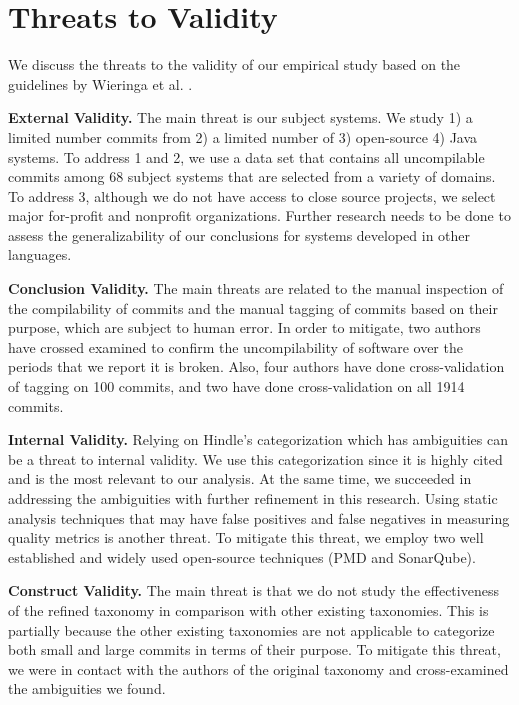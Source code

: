 \section{Threats to Validity}
\label{sec:threats}

We discuss the threats to the validity of our empirical study based on the guidelines by Wieringa et al.
 \cite{38631e0608b54d4299d5707f3a78debf}.


\textbf{External Validity.}
The main threat is our subject systems.
We study 1) a limited number commits from 2) a limited number of 3) open-source 4) Java systems.
To address 1 and 2, we use a data set that contains all uncompilable commits among 68 subject systems that are selected from a variety of domains.
To address 3, although we do not have access to close source projects, we select major for-profit and nonprofit organizations.
Further research needs to be done to assess the generalizability of our conclusions for systems developed in other languages. 

\textbf{Conclusion Validity.}
The main threats are related to the manual inspection of the compilability of commits and the manual tagging of commits based on their purpose, which are subject to human error.
In order to mitigate, two authors have crossed examined to confirm the uncompilability of software over the periods that we report it is broken.
Also, four authors have done cross-validation of tagging on 100 commits, and two have done cross-validation on all 1914 commits.

\textbf{Internal Validity.}
Relying on Hindle's categorization which has ambiguities can be a threat to internal validity.
We use this categorization since it is highly cited and is the most relevant to our analysis. At the same time, we succeeded in addressing the ambiguities with further refinement in this research. 
Using static analysis techniques that may have false positives and false negatives in measuring quality metrics is another threat.
To mitigate this threat, we employ two well established and widely used open-source techniques (PMD and SonarQube).

\textbf{Construct Validity.}
The main threat is that we do not study the effectiveness of the refined taxonomy in comparison with other existing taxonomies.
This is partially because the other existing taxonomies are not applicable to categorize both small and large commits in terms of their purpose. 
To mitigate this threat, we were in contact with the authors of the original taxonomy and cross-examined the ambiguities we found.
